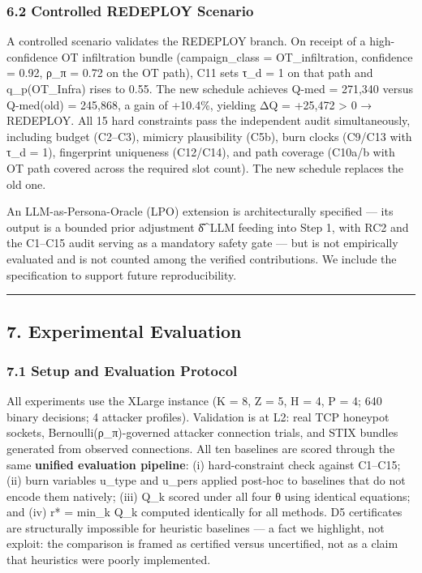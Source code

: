 \documentclass[
  11pt,
]{article}
\begin{document}
\hypertarget{controlled-redeploy-scenario}{%
\subsubsection{6.2 Controlled REDEPLOY
Scenario}\label{controlled-redeploy-scenario}}

A controlled scenario validates the REDEPLOY branch. On receipt of a
high-confidence OT infiltration bundle (campaign\_class =
OT\_infiltration, confidence = 0.92, ρ\_π = 0.72 on the OT path), C11
sets τ\_d = 1 on that path and q\_p(OT\_Infra) rises to 0.55. The new
schedule achieves Q-med = 271,340 versus Q-med(old) = 245,868, a gain of
+10.4\%, yielding ΔQ = +25,472 \textgreater{} 0 → REDEPLOY. All 15 hard
constraints pass the independent audit simultaneously, including budget
(C2--C3), mimicry plausibility (C5b), burn clocks (C9/C13 with τ\_d =
1), fingerprint uniqueness (C12/C14), and path coverage (C10a/b with OT
path covered across the required slot count). The new schedule replaces
the old one.

An LLM-as-Persona-Oracle (LPO) extension is architecturally specified
--- its output is a bounded prior adjustment δ̂\^{}LLM feeding into Step
1, with RC2 and the C1--C15 audit serving as a mandatory safety gate ---
but is not empirically evaluated and is not counted among the verified
contributions. We include the specification to support future
reproducibility.

\begin{center}\rule{0.5\linewidth}{0.5pt}\end{center}

\hypertarget{experimental-evaluation}{%
\subsection{7. Experimental Evaluation}\label{experimental-evaluation}}

\hypertarget{setup-and-evaluation-protocol}{%
\subsubsection{7.1 Setup and Evaluation
Protocol}\label{setup-and-evaluation-protocol}}

All experiments use the XLarge instance (\textbar K\textbar{} = 8,
\textbar Z\textbar{} = 5, H = 4, \textbar P\textbar{} = 4; 640 binary
decisions; 4 attacker profiles). Validation is at L2: real TCP honeypot
sockets, Bernoulli(ρ\_π)-governed attacker connection trials, and STIX
bundles generated from observed connections. All ten baselines are
scored through the same \textbf{unified evaluation pipeline}: (i)
hard-constraint check against C1--C15; (ii) burn variables u\_type and
u\_pers applied post-hoc to baselines that do not encode them natively;
(iii) Q\_k scored under all four θ using identical equations; and (iv)
r* = min\_k Q\_k computed identically for all methods. D5 certificates
are structurally impossible for heuristic baselines --- a fact we
highlight, not exploit: the comparison is framed as certified versus
uncertified, not as a claim that heuristics were poorly implemented.
\end{document}
